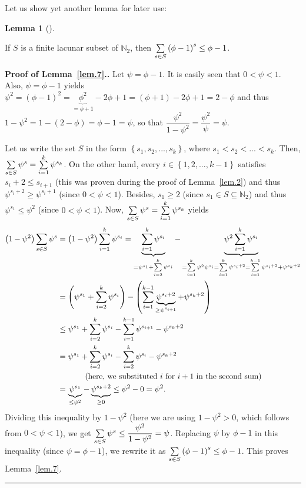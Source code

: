 \documentclass[numbers=enddot,12pt,final,onecolumn,notitlepage]{scrartcl}%
\numberwithin{exer}{section}
\theoremstyle{definition}
\newtheorem{lem}[theo]{Lemma}
\newenvironment{lemma}[1][]
{\begin{lem}[#1]\begin{leftbar}}
{\end{leftbar}\end{lem}}
\newenvironment{proof}[1][Proof]{\noindent\textbf{#1.} }{\ \rule{0.5em}{0.5em}}
\let\sumnonlimits\sum
\renewcommand{\sum}{\sumnonlimits\limits}
\begin{document}
Let us show yet another lemma for later use:

\begin{lemma} \label{lem.7}
If $S$ is a finite lacunar subset of $\mathbb{N}_{2}$,
then $\sum\limits_{s\in S}\left(  \phi-1\right)  ^{s}\leq\phi-1$.
\end{lemma}

\begin{proof}[Proof of Lemma~\ref{lem.7}.] Let $\psi=\phi-1$. It is easily seen that
$0<\psi<1$. Also, $\psi=\phi-1$ yields $\psi^{2}=\left(  \phi-1\right)
^{2}=\underbrace{\phi^{2}}_{=\phi+1}-2\phi+1=\left(  \phi+1\right)
-2\phi+1=2-\phi$ and thus $1-\psi^{2}=1-\left(  2-\phi\right)  =\phi-1=\psi$,
so that $\dfrac{\psi^{2}}{1-\psi^{2}}=\dfrac{\psi^{2}}{\psi}=\psi$.

Let us write the set $S$ in the form $\left\{  s_{1},s_{2},...,s_{k}\right\}
$, where $s_{1}<s_{2}<...<s_{k}$. Then, $\sum\limits_{s\in S}\psi^{s}%
=\sum\limits_{i=1}^{k}\psi^{s_{k}}$. On the other hand, every $i\in\left\{
1,2,...,k-1\right\}  $ satisfies $s_{i}+2\leq s_{i+1}$ (this was proven during
the proof of Lemma~\ref{lem.2}) and thus $\psi^{s_{i}+2}\geq\psi^{s_{i}+1}$ (since
$0<\psi<1$). Besides, $s_{1}\geq2$ (since $s_{1}\in S\subseteq\mathbb{N}_{2}$)
and thus $\psi^{s_{1}}\leq\psi^{2}$ (since $0<\psi<1$). Now, $\sum
\limits_{s\in S}\psi^{s}=\sum\limits_{i=1}^{k}\psi^{s_{k}}$ yields%
\begin{align*}
\left(  1-\psi^{2}\right)  \sum\limits_{s\in S}\psi^{s}  &  =\left(
1-\psi^{2}\right)  \sum\limits_{i=1}^{k}\psi^{s_{i}}=\underbrace{\sum
\limits_{i=1}^{k}\psi^{s_{i}}}_{=\psi^{s_{1}}+\sum\limits_{i=2}^{k}\psi
^{s_{i}}}-\underbrace{\psi^{2}\sum\limits_{i=1}^{k}\psi^{s_{i}}}%
_{=\sum\limits_{i=1}^{k}\psi^{2}\psi^{s_{i}}=\sum\limits_{i=1}^{k}\psi
^{s_{i}+2}=\sum\limits_{i=1}^{k-1}\psi^{s_{i}+2}+\psi^{s_{k}+2}}\\
&  =\left(  \psi^{s_{1}}+\sum\limits_{i=2}^{k}\psi^{s_{i}}\right)  -\left(
\sum\limits_{i=1}^{k-1}\underbrace{\psi^{s_{i}+2}}_{\geq\psi^{s_{i+1}}}%
+\psi^{s_{k}+2}\right) \\
&  \leq\psi^{s_{1}}+\sum\limits_{i=2}^{k}\psi^{s_{i}}-\sum\limits_{i=1}%
^{k-1}\psi^{s_{i+1}}-\psi^{s_{k}+2}\\
&  =\psi^{s_{1}}+\sum\limits_{i=2}^{k}\psi^{s_{i}}-\sum\limits_{i=2}^{k}%
\psi^{s_{i}}-\psi^{s_{k}+2}\\
&  \ \ \ \ \ \ \ \ \ \ \left(  \text{here, we substituted }i\text{ for
}i+1\text{ in the second sum}\right) \\
&  =\underbrace{\psi^{s_{1}}}_{\leq\psi^{2}}-\underbrace{\psi^{s_{k}+2}}%
_{\geq0}\leq\psi^{2}-0=\psi^{2}.
\end{align*}
Dividing this inequality by $1-\psi^{2}$ (here we are using $1-\psi^{2}>0$,
which follows from $0<\psi<1$), we get $\sum\limits_{s\in S}\psi^{s}\leq
\dfrac{\psi^{2}}{1-\psi^{2}}=\psi$. Replacing $\psi$ by $\phi-1$ in this
inequality (since $\psi=\phi-1$), we rewrite it as $\sum\limits_{s\in
S}\left(  \phi-1\right)  ^{s}\leq\phi-1$. This proves Lemma~\ref{lem.7}.
\end{proof}
\end{document}
